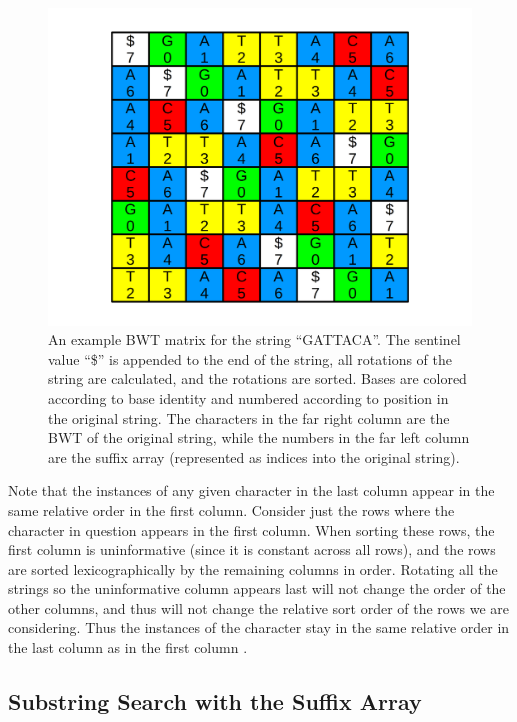 \begin{figure}[ht]
    \centering
    \includegraphics[width=1.0\textwidth]{figures/01_introduction/bwt.png}
    \caption[An example BWT matrix for the string ``GATTACA'']{An example BWT matrix for the string ``GATTACA''. The sentinel value ``\$'' is appended to the end of the string, all rotations of the string are calculated, and the rotations are sorted. Bases are colored according to base identity and numbered according to position in the original string. The characters in the far right column are the BWT of the original string, while the numbers in the far left column are the suffix array (represented as indices into the original string).}
    \label{fig:bwt}
\end{figure}

Note that the instances of any given character in the last column appear in the same relative order in the first column. Consider just the rows where the character in question appears in the first column. When sorting these rows, the first column is uninformative (since it is constant across all rows), and the rows are sorted lexicographically by the remaining columns in order. Rotating all the strings so the uninformative column appears last will not change the order of the other columns, and thus will not change the relative sort order of the rows we are considering. Thus the instances of the character stay in the same relative order in the last column as in the first column \cite{langmead2013introduction}.
    
\subsection{Substring Search with the Suffix Array}

